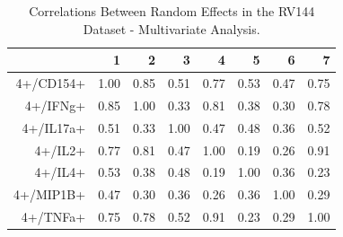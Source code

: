 \documentclass{article}\usepackage[]{graphicx}\usepackage[]{color}
\begin{document}
\begin{table}[ht]
\centering
\begin{tabular}{rrrrrrrr}
  \hline
 & 1 & 2 & 3 & 4 & 5 & 6 & 7 \\ 
  \hline
4+/CD154+ & 1.00 & 0.85 & 0.51 & 0.77 & 0.53 & 0.47 & 0.75 \\ 
  4+/IFNg+ & 0.85 & 1.00 & 0.33 & 0.81 & 0.38 & 0.30 & 0.78 \\ 
  4+/IL17a+ & 0.51 & 0.33 & 1.00 & 0.47 & 0.48 & 0.36 & 0.52 \\ 
  4+/IL2+ & 0.77 & 0.81 & 0.47 & 1.00 & 0.19 & 0.26 & 0.91 \\ 
  4+/IL4+ & 0.53 & 0.38 & 0.48 & 0.19 & 1.00 & 0.36 & 0.23 \\ 
  4+/MIP1B+ & 0.47 & 0.30 & 0.36 & 0.26 & 0.36 & 1.00 & 0.29 \\ 
  4+/TNFa+ & 0.75 & 0.78 & 0.52 & 0.91 & 0.23 & 0.29 & 1.00 \\ 
   \hline
\end{tabular}
\caption{Correlations Between Random Effects in the RV144 Dataset - Multivariate Analysis.}
\label{multiCorTable}
\end{table}
\end{document}
